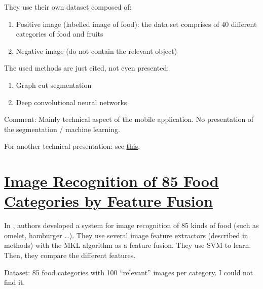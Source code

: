 They use their own dataset composed of:
\begin{enumerate}
    \item Positive image (labelled image of food): the data set comprises of 40 different categories of food and fruits
    \item Negative image (do not contain the relevant object)
\end{enumerate}

The used methods are just cited, not even presented: 
\begin{enumerate}
    \item Graph cut segmentation
    \item Deep convolutional neural networks
\end{enumerate}

Comment:
Mainly technical aspect of the mobile application. No presentation of the segmentation / machine learning.

For another technical presentation: see \href{http://ieeexplore.ieee.org/stamp/stamp.jsp?tp=&arnumber=6890665}{this}. 

\section{\href{http://ieeexplore.ieee.org/xpl/articleDetails.jsp?arnumber=5693856}{Image Recognition of 85 Food Categories by Feature Fusion}}

In \cite{Hoashi2010a}, authors developed a system for image recognition of 85 kinds of food (such as omelet, hamburger …). They use several image feature extractors (described in methods) with the MKL algorithm as a feature fusion. They use SVM to learn. 
Then, they compare the different features.

Dataset: 85 food categories with 100 “relevant” images per category. I could not find it.

